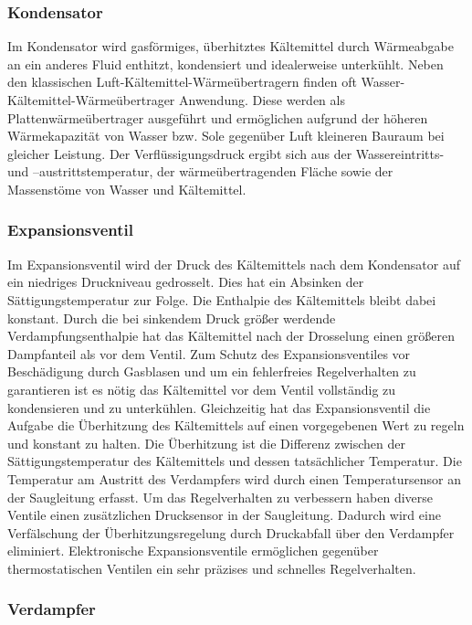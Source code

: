 \subsubsection{Kondensator}
\label{subsubsec:Kondensator}

Im Kondensator wird gasförmiges, überhitztes Kältemittel durch Wärmeabgabe an ein anderes Fluid enthitzt, kondensiert und idealerweise unterkühlt. Neben den klassischen Luft-Kältemittel-Wärmeübertragern finden oft Wasser-Kältemittel-Wärmeübertrager Anwendung. Diese werden als Plattenwärmeübertrager ausgeführt und ermöglichen aufgrund der höheren Wärmekapazität von Wasser bzw. Sole gegenüber Luft kleineren Bauraum bei gleicher Leistung. Der Verflüssigungsdruck ergibt sich aus der Wassereintritts- und –austrittstemperatur, der wärmeübertragenden Fläche sowie der Massenstöme von Wasser und Kältemittel\cite{Kulterer.2007}.

\subsubsection{Expansionsventil}
\label{subsubsec:Expansionsventil}


Im Expansionsventil wird der Druck des Kältemittels nach dem Kondensator auf ein niedriges Druckniveau gedrosselt. Dies hat ein Absinken der Sättigungstemperatur zur Folge. Die Enthalpie des Kältemittels bleibt dabei konstant. Durch die bei sinkendem Druck größer werdende Verdampfungsenthalpie hat das Kältemittel nach der Drosselung einen größeren Dampfanteil als vor dem Ventil. Zum Schutz des Expansionsventiles vor Beschädigung durch Gasblasen und um ein fehlerfreies Regelverhalten zu garantieren ist es nötig das Kältemittel vor dem Ventil vollständig zu kondensieren und zu unterkühlen. Gleichzeitig hat das Expansionsventil die Aufgabe die Überhitzung des Kältemittels auf einen vorgegebenen Wert zu regeln und konstant zu halten. Die Überhitzung ist die Differenz zwischen der Sättigungstemperatur des Kältemittels und dessen tatsächlicher Temperatur. Die Temperatur am Austritt des Verdampfers wird durch einen Temperatursensor an der Saugleitung erfasst. Um das Regelverhalten zu verbessern haben diverse Ventile einen zusätzlichen Drucksensor in der Saugleitung. Dadurch wird eine Verfälschung der Überhitzungsregelung durch Druckabfall über den Verdampfer eliminiert. Elektronische Expansionsventile ermöglichen gegenüber thermostatischen Ventilen ein sehr präzises und schnelles Regelverhalten. 

\subsubsection{Verdampfer}
\label{subsubsec:Verdampfer}

